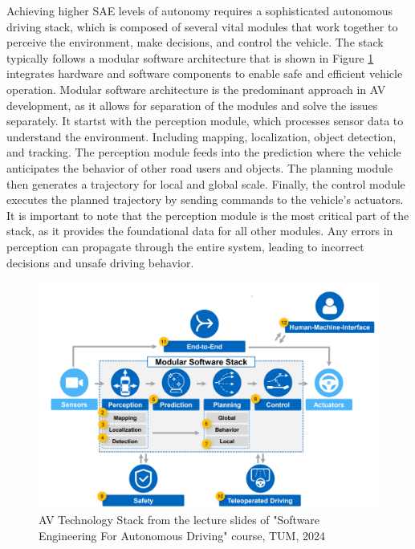  Achieving higher SAE levels of autonomy requires a sophisticated autonomous driving stack,
 which is composed of several vital modules that work together to perceive the environment,
 make decisions, and control the vehicle. The stack typically follows a modular software
 architecture that is shown in Figure \ref{fig:AVStack} integrates hardware and software components to enable safe and
 efficient vehicle operation.
 Modular software architecture is the predominant approach in \ac{AV} development, as it allows for separation of the
 modules and solve the issues separately. It startst with the perception module, which processes sensor data to understand
 the environment. Including mapping, localization, object detection, and tracking. The perception module feeds into the prediction
 where the vehicle anticipates the behavior of other road users and objects. The planning module then generates a trajectory for local
 and global scale. Finally, the control module executes the planned trajectory by sending commands to the vehicle's actuators. It is important
 to note that the perception module is the most critical part of the stack, as it provides the foundational data for all other modules. Any errors
 in perception can propagate through the entire system, leading to incorrect decisions and unsafe driving behavior.

\begin{figure}[h]
    \includegraphics[scale=0.135]{figures/AVStack.png}
    \centering
    \caption{\ac{AV} Technology Stack
    from the lecture slides of "Software Engineering For Autonomous Driving" course, TUM, 2024 \cite{tum2024avstack}} %
    \label{fig:AVStack}
\end{figure}

